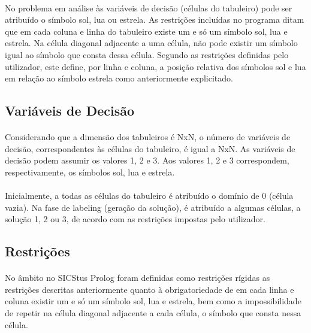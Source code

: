 \documentclass[a4paper]{article}
\begin{document}
\paragraph{}
No problema em análise às variáveis de decisão (células do tabuleiro) pode ser atribuído o símbolo sol, lua ou estrela. As restrições incluídas no programa ditam que em cada coluna e linha do tabuleiro existe um e só um símbolo sol, lua e estrela. Na célula diagonal adjacente a uma célula, não pode existir um símbolo igual ao símbolo que consta dessa célula. Segundo as restrições definidas pelo utilizador, este define, por linha e coluna, a posição relativa dos símbolos sol e lua em relação ao símbolo estrela como anteriormente explicitado.

\subsection{Variáveis de Decisão}

\paragraph{}
Considerando que a dimensão dos tabuleiros é NxN, o número de variáveis de decisão, correspondentes às células do tabuleiro, é igual a NxN. As variáveis de decisão podem assumir os valores 1, 2 e 3. Aos valores 1, 2 e 3 correspondem, respectivamente, os símbolos sol, lua e estrela.

\paragraph{}
Inicialmente, a todas as células do tabuleiro é atribuído o domínio de 0 (célula vazia). Na fase de labeling (geração da solução), é atribuído a algumas células, a solução 1, 2 ou 3, de acordo com as restrições impostas pelo utilizador.

\subsection{Restrições} 

\paragraph{}
No âmbito no SICStus Prolog foram definidas como restrições rígidas as restrições descritas anteriormente quanto à obrigatoriedade de em cada linha e coluna existir um e só um símbolo sol, lua e estrela, bem como a impossibilidade de repetir na célula diagonal adjacente a cada célula, o símbolo que consta nessa célula. 
\end{document}
